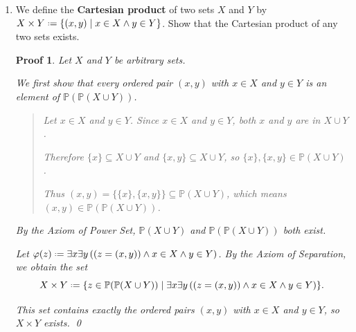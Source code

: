 \documentclass[12pt]{article}
\newcommand{\defn}[1]{\textbf{#1}}
\newcommand{\defeq}{\mathrel{\vcenter{\baselineskip0.5ex \lineskiplimit0pt
                     \hbox{\scriptsize.}\hbox{\scriptsize.}}}=}
\newcommand{\Pow}{\mathbb{P}}
\theoremstyle{proofstyle}
\newtheorem*{proof*}{Proof}
\begin{document}
\begin{enumerate}[left=0pt, itemsep=2em, parsep=1em]
\begin{enumerate}[label=(\alph*), itemsep=1.5em, leftmargin=2em]
\end{enumerate}

\newpage

\item We define the \defn{Cartesian product} of two sets $X$ and $Y$ by $X \times Y \defeq \{(x, y) \mid x \in X \wedge y \in Y\}$. Show that the Cartesian product of any two sets exists.

\begin{proof*}
    Let $X$ and $Y$ be arbitrary sets.

    We first show that every ordered pair $(x, y)$ with $x \in X$ and $y \in Y$ is an element of $\Pow(\Pow(X \cup Y))$.

    \begin{quote}
        Let $x \in X$ and $y \in Y$. Since $x \in X$ and $y \in Y$, both $x$ and $y$ are in $X \cup Y$.

        Therefore $\{x\} \subseteq X \cup Y$ and $\{x, y\} \subseteq X \cup Y$, so $\{x\}, \{x,y\} \in \Pow(X \cup Y)$.

        Thus $(x, y) = \{\{x\}, \{x, y\}\} \subseteq \Pow(X \cup Y)$, which means \\ $(x, y) \in \Pow(\Pow(X \cup Y))$.
    \end{quote}

    By the Axiom of Power Set, $\Pow(X \cup Y)$ and $\Pow(\Pow(X \cup Y))$ both exist.

    Let $\varphi(z) \defeq \exists x \exists y\,((z = (x, y)) \wedge x \in X \wedge y \in Y)$. By the Axiom of Separation, we obtain the set
    \[
        X \times Y \defeq \{z \in \Pow(\Pow(X \cup Y)) \mid \exists x \exists y\,((z = (x, y)) \wedge x \in X \wedge y \in Y)\}.
    \]

    This set contains exactly the ordered pairs $(x, y)$ with $x \in X$ and $y \in Y$, so $X \times Y$ exists. \qed
\end{proof*}

\end{enumerate}
\end{document}
